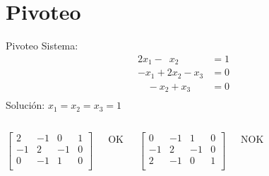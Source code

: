 \documentclass[9pt, aspectratio=169]{beamer}
\begin{document}
\section{Pivoteo}
%
%
%
%
\begin{frame}{Pivoteo}
Sistema:
\begin{align*}
 2 x_1 - \phantom{2} x_2 \phantom{ + x_3}\;\; &= 1 \\
 -x_1 + 2 x_2 - x_3 &= 0 \\
\phantom{x_1} -x_2 + x_3 &= 0 \\
\end{align*}
Solución: \( x_1 = x_2 = x_3 = 1 \) \bigskip
\begin{columns}[c]
 \column{5cm}
  \begin{equation*}
    \left[ 
    \begin{array}{ccc|c}
    2 & -1 & 0 & 1 \\
    -1 & 2 & -1 & 0 \\
    0 & -1 & 1 & 0\\
    \end{array} \right] 
  \end{equation*}
  \begin{center} OK \end{center} \pause
 \column{5cm}
  \begin{equation*}
    \left[ 
    \begin{array}{ccc|c}
    0 & -1 & 1 & 0\\
    -1 & 2 & -1 & 0 \\
    2 & -1 & 0 & 1 \\
    \end{array} \right] 
  \end{equation*}
  \begin{center} \alert{NOK} \end{center} 
\end{columns}
\end{frame}
\end{document}
